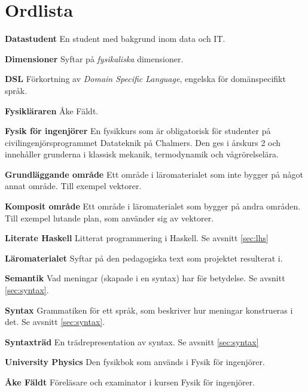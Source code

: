 
\chapter*{Ordlista}

\textbf{Datastudent} En student med bakgrund inom data och IT.

\textbf{Dimensioner} Syftar på \textit{fysikaliska} dimensioner.

\textbf{DSL} Förkortning av \textit{Domain Specific Language}, engelska för domänspecifikt språk.

\textbf{Fysikläraren} Åke Fäldt.

\textbf{Fysik för ingenjörer} En fysikkurs som är obligatorisk för studenter på civilingenjörsprogrammet Datateknik på Chalmers. Den ges i årskurs 2 och innehåller grunderna i klassisk mekanik, termodynamik och vågrörelselära.

\textbf{Grundläggande område} Ett område i läromaterialet som inte bygger på något annat område. Till exempel vektorer.

\textbf{Komposit område} Ett område i läromaterialet som bygger på andra områden. Till exempel lutande plan, som använder sig av vektorer.

\textbf{Literate Haskell} Litterat programmering i Haskell. Se avsnitt \ref{sec:lhs}

\textbf{Läromaterialet} Syftar på den pedagogiska text som projektet resulterat i.

\textbf{Semantik} Vad meningar (skapade i en syntax) har för betydelse. Se avsnitt \ref{sec:syntax}.

\textbf{Syntax} Grammatiken för ett språk, som beskriver hur meningar konstrueras i det. Se avsnitt \ref{sec:syntax}.

\textbf{Syntaxträd} En trädrepresentation av syntax. Se avsnitt \ref{sec:syntax}

\textbf{University Physics} Den fysikbok som används i Fysik för ingenjörer.

\textbf{Åke Fäldt} Föreläsare och examinator i kursen Fysik för ingenjörer.
